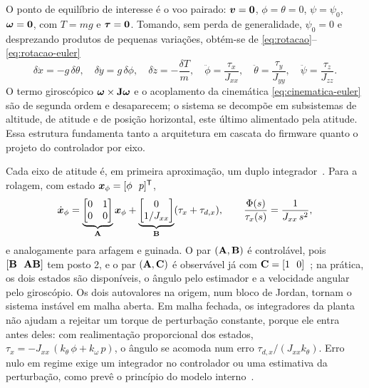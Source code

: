O ponto de equilíbrio de interesse é o voo pairado: $\bm{v} = \bm{0}$,
$\phi = \theta = 0$, $\psi = \psi_0$, $\bm{\omega} = \bm{0}$, com
$T = mg$ e $\bm{\tau} = \bm{0}$. Tomando, sem perda de generalidade,
$\psi_0 = 0$ e desprezando produtos de pequenas variações, obtém-se de
\eqref{eq:rotacao}--\eqref{eq:rotacao-euler}
\begin{equation}
\delta\ddot{x} = -g\,\delta\theta, \quad
\delta\ddot{y} = g\,\delta\phi, \quad
\delta\ddot{z} = -\frac{\delta T}{m}, \quad
\ddot\phi = \frac{\tau_x}{J_{xx}}, \quad
\ddot\theta = \frac{\tau_y}{J_{yy}}, \quad
\ddot\psi = \frac{\tau_z}{J_{zz}}.
\label{eq:linear}
\end{equation}
O termo giroscópico $\bm{\omega}\times\mathbf{J}\bm{\omega}$ e o
acoplamento da cinemática \eqref{eq:cinematica-euler} são de segunda ordem e
desaparecem; o sistema se decompõe em subsistemas de altitude, de atitude e de
posição horizontal, este último alimentado pela atitude. Essa estrutura
fundamenta tanto a arquitetura em cascata do firmware quanto o projeto do
controlador por eixo.

Cada eixo de atitude é, em primeira aproximação, um duplo
integrador~\cite{rao2001}. Para a
rolagem, com estado $\vetor{x}_\phi = [\phi\ \ p]^{\mathsf{T}}$,
\begin{equation}
\dot{\bm{x}}_\phi =
\underbrace{\begin{bmatrix} 0 & 1 \\ 0 & 0 \end{bmatrix}}_{\mathbf{A}}
\bm{x}_\phi +
\underbrace{\begin{bmatrix} 0 \\ 1/J_{xx} \end{bmatrix}}_{\mathbf{B}}
(\tau_x + \tau_{d,x}),
\qquad
\frac{\Phi(s)}{\tau_x(s)} = \frac{1}{J_{xx}\,s^2},
\label{eq:duplo-integrador}
\end{equation}
e analogamente para arfagem e guinada. O par $(\mathbf{A}, \mathbf{B})$ é
controlável, pois $[\mathbf{B}\ \ \mathbf{A}\mathbf{B}]$ tem posto 2, e o par
$(\mathbf{A}, \mathbf{C})$ é observável já com
$\mathbf{C} = [1\ \ 0]$~\cite{ogata2010}; na
prática, os dois estados são disponíveis, o ângulo pelo estimador e a
velocidade angular pelo giroscópio. Os dois autovalores na origem, num bloco
de Jordan, tornam o sistema instável em malha aberta. Em malha fechada, os
integradores da planta não ajudam a rejeitar um torque de perturbação
constante, porque ele entra antes deles: com realimentação proporcional dos
estados, $\tau_x = -J_{xx}\,(k_\theta\,\phi + k_\omega\,p)$, o ângulo se
acomoda num erro $\tau_{d,x}/(J_{xx}k_\theta)$. Erro nulo em regime exige um
integrador no controlador ou uma estimativa da perturbação, como prevê o
princípio do modelo interno~\cite{francis1976}.

